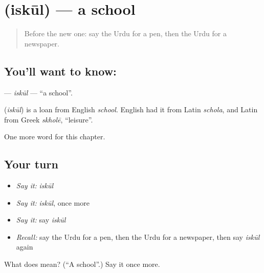\section[\texorpdfstring{\ur{اسکول} (iskūl)}{اسکول (iskūl)}]{ (iskūl) — a school}

\label{lesson:UR-C61-iskul}



\begin{quote}
Before the new one: say the Urdu for a pen, then the Urdu for a newspaper.
\end{quote}

\subsection*{You'll want to know: }
\textbf{} — \emph{iskūl} — \textquotedblleft{}a school\textquotedblright{}.

\begin{cousinweb}
\textbf{} (\emph{iskūl}) is a loan from English \emph{school}. English had it from Latin \emph{schola}, and Latin from Greek \emph{skholē}, \textquotedblleft{}leisure\textquotedblright{}.
\end{cousinweb}

\begin{grammarlens}[title={What you've built}]
One more word for this chapter.
\end{grammarlens}

\subsection*{Your turn}
\begin{itemize}
\raggedright
  \item \emph{Say it:} \emph{iskūl}
  \item \emph{Say it:} \emph{iskūl}, once more
  \item \emph{Say it:} say \emph{iskūl}
  \item \emph{Recall:} say the Urdu for a pen, then the Urdu for a newspaper, then say \emph{iskūl} again
\end{itemize}

\begin{tcolorbox}[breakable,colback=teal!4,colframe=teal!35!black,title={Before you move on}]
What does  mean? (\textquotedblleft{}A school\textquotedblright{}.) Say it once more.
\end{tcolorbox}
